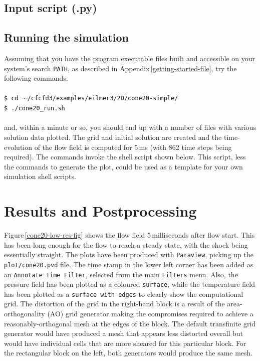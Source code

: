 \subsection{Input script (.py)}
%

\noindent\topbar

\bottombar


\subsection{Running the simulation}
%
Assuming that you have the program executable files built and
accessible on your system's search \texttt{PATH}, as described in Appendix\,\ref{getting-started-file},
try the following commands:\\
%
\topbar\\
\texttt{\$ cd $\sim$/cfcfd3/examples/eilmer3/2D/cone20-simple/}\\
\texttt{\$ ./cone20\_run.sh}\\
\bottombar\\
%
and, within a minute or so, you should end up with a number of files
with various solution data plotted.
The grid and initial solution are created and the time-evolution of the
flow field is computed for 5\,ms (with 862 time steps being required).
The commands invoke the shell script shown below.
This script, less the commands to generate the plot, could be used as
a template for your own simulation shell scripts.

\noindent \topbar

\bottombar

\section{Results and Postprocessing}
%
Figure\,\ref{cone20-low-res-fig} shows the flow field 5\,milliseconds after flow start.
This has been long enough for the flow to reach a steady state, with the shock being essentially straight.
The plots have been produced with \verb!Paraview!, picking up the \verb!plot/cone20.pvd! file.
The time stamp in the lower left corner has been added as an \verb!Annotate Time Filter!, 
selected from the main \verb!Filters! menu.
Also, the pressure field has been plotted as a coloured \verb!surface!, 
while the temperature field has been plotted as a \verb!surface with edges!
to clearly show the computational grid.
The distortion of the grid in the right-hand block is a result of the area-orthogonality (AO) grid generator
making the compromises required to achieve a reasonably-orthogonal mesh at the edges of the block.
The default transfinite grid generator would have produced a mesh that appears less distorted
overall but would have individual cells that are more sheared for this particular block.
For the rectangular block on the left, both generators would produce the same mesh.

